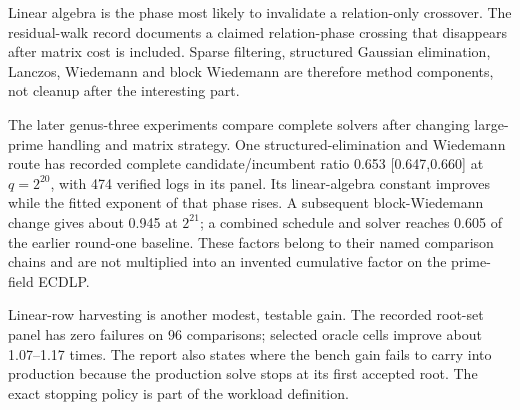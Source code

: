 Linear algebra is the phase most likely to invalidate a relation-only
crossover. The residual-walk record documents a claimed relation-phase
crossing that disappears after matrix cost is included. Sparse filtering,
structured Gaussian elimination, Lanczos, Wiedemann and block Wiedemann
are therefore method components, not cleanup after the interesting part.

The later genus-three experiments compare complete solvers after changing
large-prime handling and matrix strategy. One structured-elimination and
Wiedemann route has recorded complete candidate/incumbent ratio 0.653
[0.647,0.660] at $q=2^{20}$, with 474 verified logs in its panel.
Its linear-algebra constant improves while the fitted exponent of that
phase rises. A subsequent block-Wiedemann change gives about 0.945 at
$2^{21}$; a combined schedule and solver reaches 0.605 of the earlier
round-one baseline. These factors belong to their named comparison
chains and are not multiplied into an invented cumulative factor on the
prime-field ECDLP.

Linear-row harvesting is another modest, testable gain. The recorded
root-set panel has zero failures on 96 comparisons; selected oracle
cells improve about 1.07--1.17 times. The report also states where the
bench gain fails to carry into production because the production solve
stops at its first accepted root. The exact stopping policy is part of
the workload definition.

